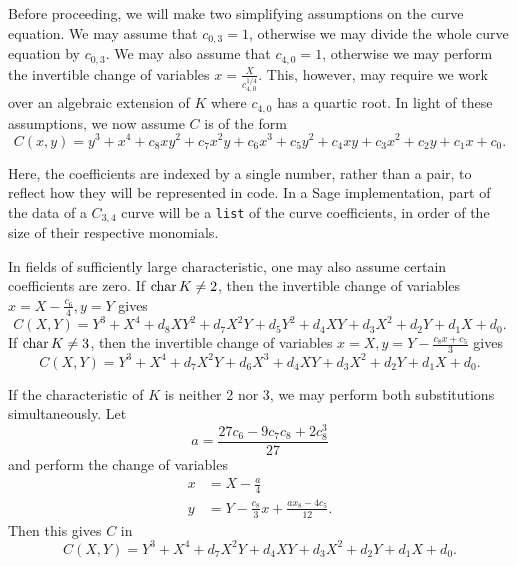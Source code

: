 Before proceeding, we will make two simplifying assumptions on the curve equation.
We may assume that $c_{0,3} = 1$, otherwise we may divide the whole curve equation by $c_{0,3}$.
We may also assume that $c_{4,0} = 1$, otherwise we may perform the invertible change of variables $x = \frac X {c_{4,0}^{1/4}}$.
This, however, may require we work over an algebraic extension of $K$ where $c_{4,0}$ has a quartic root.
In light of these assumptions, we now assume $C$ is of the form
\begin{equation}
  \label{eq_c34}
  C(x,y) = y^3 + x^4 + c_8xy^2 + c_7x^2y + c_6x^3 + c_5y^2 + c_4xy + c_3x^2 + c_2y + c_1x + c_0.
\end{equation}

Here, the coefficients are indexed by a single number, rather than a pair, to reflect how they will be represented in code.
In a Sage implementation, part of the data of a $C_{3,4}$ curve will be a {\tt list} of the curve coefficients,
in order of the size of their respective monomials.

In fields of sufficiently large characteristic, one may also assume certain coefficients are zero.
If $\operatorname{char} K \neq 2$, then the invertible change of variables $x = X - \frac {c_6} 4, y = Y$ gives
\begin{equation}
  \label{eq_c34_char_not_2}
  C(X,Y) = Y^3 + X^4 + d_8XY^2 + d_7X^2Y + d_5Y^2 + d_4XY + d_3X^2 + d_2Y + d_1X + d_0.
\end{equation}
If $\operatorname{char} K \neq 3$, then the invertible change of variables $x = X, y = Y - \frac{c_8x + c_5}{3}$ gives
\begin{equation}
  \label{eq_c34_char_not_3}
  C(X,Y) = Y^3 + X^4 + d_7X^2Y + d_6X^3 + d_4XY + d_3X^2 + d_2Y + d_1X + d_0.
\end{equation}

If the characteristic of $K$ is neither 2 nor 3, we may perform both substitutions simultaneously. Let
\[ a = \frac {27c_6 - 9c_7c_8 + 2c_8^3} {27} \]
and perform the change of variables
\begin{align*}
  x &= X - \frac a 4 \\
  y &= Y - \frac {c_8} {3} x + \frac {ax_8 - 4c_5} {12}.
\end{align*}
Then this gives $C$ in 
\begin{equation}
  \label{eq_c34_short}
  C(X,Y) = Y^3 + X^4 + d_7X^2Y + d_4XY + d_3X^2 + d_2Y + d_1X + d_0.
\end{equation}

